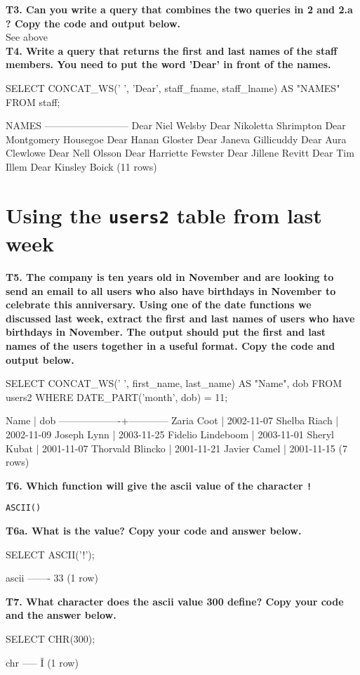 \textbf{T3. Can you write a query that combines the two queries in 2 and 2.a ? Copy the code and output below.}\\
See above\\

\textbf{T4. Write a query that returns the first and last names of the staff members. You need to put the word 'Dear' in front of the names.}
\begin{sql}
SELECT CONCAT_WS(' ', 'Dear', staff_fname, staff_lname) AS "NAMES" FROM staff;
\end{sql}
\begin{pseudo}
          NAMES
--------------------------
 Dear Niel Welsby
 Dear Nikoletta Shrimpton
 Dear Montgomery Housegoe
 Dear Hanan Gloster
 Dear Janeva Gillicuddy
 Dear Aura Clewlowe
 Dear Nell Olsson
 Dear Harriette Fewster
 Dear Jillene Revitt
 Dear Tim Illem
 Dear Kinsley Boick
(11 rows)
\end{pseudo}

\section*{Using the \texttt{users2} table from last week}
\textbf{T5. The company is ten years old in November and are looking to send an email to all users who also have birthdays in November to celebrate this anniversary. Using one of the date functions we discussed last week, extract the first and last names of users who have birthdays in November. The output should put the first and last names of the users together in a useful format. Copy the code and output below.}
\begin{sql}
SELECT CONCAT_WS(' ', first_name, last_name) AS "Name", dob FROM users2 WHERE DATE_PART('month', dob) = 11;
\end{sql}
\begin{pseudo*}
       Name        |    dob
-------------------+------------
 Zaria Coot        | 2002-11-07
 Shelba Riach      | 2002-11-09
 Joseph Lynn       | 2003-11-25
 Fidelio Lindeboom | 2003-11-01
 Sheryl Kubat      | 2001-11-07
 Thorvald Blincko  | 2001-11-21
 Javier Camel      | 2001-11-15
(7 rows)
\end{pseudo*}

\textbf{T6. Which function will give the ascii value of the character \texttt{!}}
\begin{verbatim}
ASCII()
\end{verbatim}
\textbf{T6a. What is the value? Copy your code and answer below.}
\begin{sql}
SELECT ASCII('!');
\end{sql}
\begin{pseudo}
 ascii
-------
    33
(1 row)
\end{pseudo}
\textbf{T7. What character does the ascii value 300 define? Copy your code and the answer below.}
\begin{sql}
SELECT CHR(300);
\end{sql}
\begin{pseudo}
 chr
-----
 Ĭ
(1 row)
\end{pseudo}

